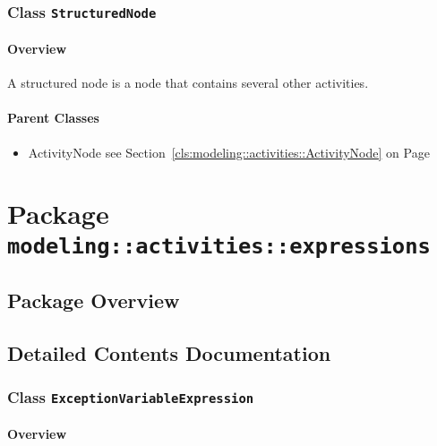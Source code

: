 \subsubsection{\Large{Class \bfseries \texttt{StructuredNode}\normalfont}}
\label{cls:modeling::activities::StructuredNode} 
\paragraph{Overview}

	
			
A structured node is a node that contains several other activities.	
		
	



\paragraph{Parent Classes}
\begin{itemize}
\item ActivityNode see Section~\ref{cls:modeling::activities::ActivityNode} on Page~\pageref{cls:modeling::activities::ActivityNode}\end{itemize}
\newpage
		


\section{Package \bfseries \texttt{modeling::activities::expressions}\normalfont}
\subsection{Package Overview}		
		



\subsection{Detailed Contents Documentation}
\subsubsection{\Large{Class \bfseries \texttt{ExceptionVariableExpression}\normalfont}}
\label{cls:modeling::activities::expressions::ExceptionVariableExpression} 
\paragraph{Overview}

